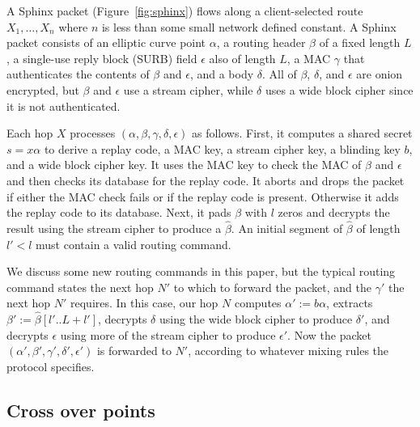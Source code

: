 \documentclass[twoside,letterpaper]{llncs}
\begin{document}
A Sphinx packet (Figure~\ref{fig:sphinx}) flows along a client-selected
route $X_1,\ldots,X_n$ where $n$ is less than some small network defined
constant.  A Sphinx packet consists of an elliptic curve point $\alpha$,
a routing header $\beta$ of a fixed length $L$, a single-use reply block
(SURB) field $\epsilon$ also of length $L$, a MAC $\gamma$ that
authenticates the contents of $\beta$ and $\epsilon$, and a body $\delta$.
All of $\beta$, $\delta$, and $\epsilon$ are onion encrypted, but $\beta$
and $\epsilon$ use a stream cipher, while $\delta$ uses a wide block
cipher since it is not authenticated.


Each hop $X$ processes $(\alpha,\beta,\gamma,\delta,\epsilon)$
as follows.  First, it computes a shared secret $s = x \alpha$ to
derive a replay code, a MAC key, a stream cipher key, 
 a blinding key $b$, and a wide block cipher key. 
It uses the MAC key to check the MAC of $\beta$ and $\epsilon$ and
 then checks its database for the replay code.
It aborts and drops the packet if either the MAC check fails or
 if the replay code is present.  Otherwise it adds the replay code
 to its database.
Next, it pads $\beta$ with $l$ zeros and decrypts the result
 using the stream cipher to produce a $\hat\beta$.
An initial segment of $\hat\beta$ of length $l' < l$ must contain
a valid routing command.  

We discuss some new routing commands in this paper, but the typical
routing command states the next hop $N'$ to which to forward the
packet, and the $\gamma'$ the next hop $N'$ requires. 
In this case, our hop $N$ computes $\alpha' := b \alpha$,
extracts $\beta' := \hat\beta[l'..L+l']$,
decrypts $\delta$ using the wide block cipher
 to produce $\delta'$, and
decrypts $\epsilon$ using more of the stream cipher
 to produce $\epsilon'$.
Now the packet $(\alpha',\beta',\gamma',\delta',\epsilon')$ is
forwarded to $N'$,
 according to whatever mixing rules the protocol specifies.


\subsection{Cross over points}

\end{document}
